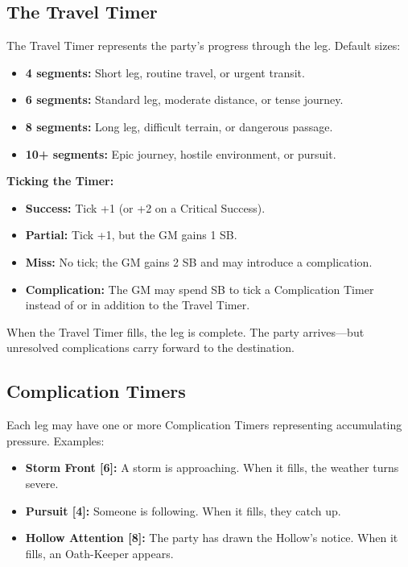 \subsection*{The Travel Timer}
\label{sec:travel-timer}

The Travel Timer represents the party's progress through the leg. Default sizes:
\begin{itemize}
\item \textbf{4 segments:} Short leg, routine travel, or urgent transit.
\item \textbf{6 segments:} Standard leg, moderate distance, or tense journey.
\item \textbf{8 segments:} Long leg, difficult terrain, or dangerous passage.
\item \textbf{10+ segments:} Epic journey, hostile environment, or pursuit.
\end{itemize}

\textbf{Ticking the Timer:}
\begin{itemize}
\item \textbf{Success:} Tick +1 (or +2 on a Critical Success).
\item \textbf{Partial:} Tick +1, but the GM gains 1 SB.
\item \textbf{Miss:} No tick; the GM gains 2 SB and may introduce a complication.
\item \textbf{Complication:} The GM may spend SB to tick a Complication Timer instead of or in addition to the Travel Timer.
\end{itemize}

When the Travel Timer fills, the leg is complete. The party arrives—but unresolved complications carry forward to the destination.

\subsection*{Complication Timers}
\label{sec:complication-timers}

Each leg may have one or more Complication Timers representing accumulating pressure. Examples:
\begin{itemize}
\item \textbf{Storm Front [6]:} A storm is approaching. When it fills, the weather turns severe.
\item \textbf{Pursuit [4]:} Someone is following. When it fills, they catch up.
\item \textbf{Hollow Attention [8]:} The party has drawn the Hollow's notice. When it fills, an Oath-Keeper appears.
\end{itemize}

